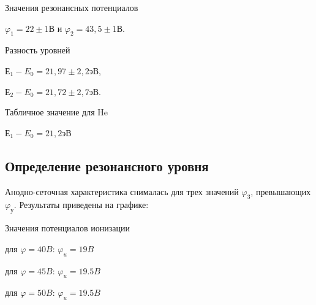 Значения резонансных потенциалов 

$\varphi_{1}=22\pm{1} \text{В}$ и $\varphi_{2}=43,5\pm{1} \text{В}$. 

Разность уровней 

$\text{Е}_{1}-E_{0}=21,97\pm{2,2} \text{эВ}$, 

$\text{Е}_{2}-E_{0}=21,72\pm{2,7} \text{эВ}$.

Табличное значение для He

$\text{Е}_{1}-E_{0}=21,2 \text{эВ}$

\subsection{Определение резонансного уровня}
Анодно-сеточная характеристика снималась для трех значений $\varphi_{3}$, превышающих $\varphi_{у}$. Результаты приведены на графике:


Значения потенциалов ионизации

для $\varphi=40B$: $\varphi_{u}=19B$

для $\varphi=45B$: $\varphi_{u}=19.5B$

для $\varphi=50B$: $\varphi_{u}=19.5B$

